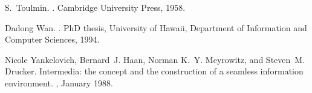 \begin{thebibliography}{1}
S.~Toulmin.
.
\newblock Cambridge University Press, 1958.

Dadong Wan.
.
\newblock PhD thesis, University of Hawaii, Department of Information and
  Computer Sciences, 1994.

Nicole Yankelovich, Bernard~J. Haan, Norman K.~Y. Meyrowitz, and Steven~M.
  Drucker.
\newblock Intermedia: the concept and the construction of a seamless
  information environment.
, January 1988.

\end{thebibliography}

%
%









